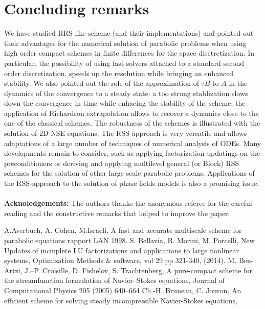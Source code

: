 \documentclass[11pt]{article}
\begin{document}
{\section{Concluding remarks}
We have studied RRS-like scheme (and their implementations) and pointed out their advantages for the numerical solution of parabolic problems when using high order compact schemes in finite differences for the space disctretization. In particular, the possibility of using fast solvers attached to a standard second order discretization, speeds up the resolution while bringing an enhanced stability.
We also pointed out the role of the
approximation of $\tau B$ to $A$ in the dynamics of the convergence to a steady state: a too strong 
stablization slows down the convergence in time while enhacing the stability of the scheme, the application of Richardson extrapolation allows to recover a dynamics close to the one of the classical schemes.
The robustness of the schemes is illustrated with the solution of 2D NSE equations.
The RSS approach is very versatile and allows adaptations of a large number of techniques of numerical analysis of ODEs. Many developments remain to consider, such as applying factorization updatings on the preconditioners or deriving and applying multilevel general (or Block) RSS schemes for the  solution of other large scale parabolic problems. Applications of the RSS-approach to the solution of phase fields models is also a promising issue. \\
\\
{\bf Acknoledgements:} The authors thanks the anonymous referee for the careful reading and the constructive remarks that helped to improve the paper.
\begin{thebibliography}{99}
 A.Averbuch, A. Cohen, M.Israeli,
A fast and accurate multiscale scheme for parabolic equations
 rapport LAN 1998.
 S. Bellavia, B. Morini, M. Porcelli, New Updates of incmplete LU factorizations and applications to large nonlinear systems, Optimization Methods \& software, vol 29 pp 321-340, (2014).
 M. Ben-Artzi, J.--P. Croisille,
D. Fishelov,  S. Trachtenberg, A pure-compact scheme for the streamfunction formulation
of Navier–Stokes equations, Journal of Computational Physics 205 (2005) 640–664
 Ch.-H. Bruneau, C. Jouron,
An efficient scheme for solving steady incompressible Navier-Stokes equations,

\end{thebibliography}}
\end{document}
